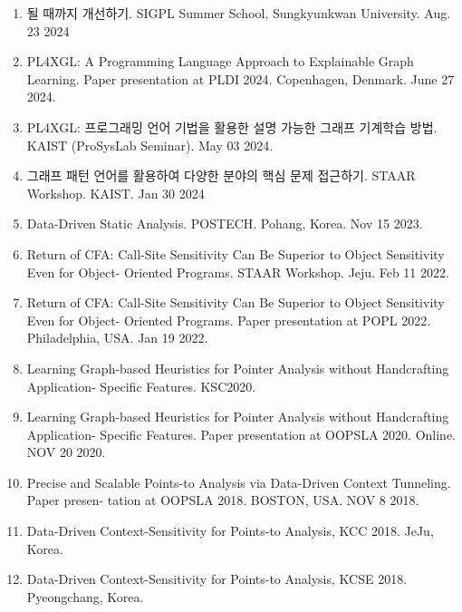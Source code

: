 \documentclass[letterpaper,11pt]{article}
\begin{document}
\begin{enumerate}
  \item{될 때까지 개선하기. SIGPL Summer School, Sungkyunkwan University. Aug. 23 2024}

  \item{PL4XGL: A Programming Language Approach to Explainable Graph Learning. Paper presentation at PLDI 2024. Copenhagen, Denmark. June 27 2024.}
  
  \item{PL4XGL: 프로그래밍 언어 기법을 활용한 설명 가능한 그래프 기계학습 방법. KAIST (ProSysLab Seminar). May 03 2024.}
  
  \item{그래프 패턴 언어를 활용하여 다양한 분야의 핵심 문제 접근하기. STAAR Workshop. KAIST. Jan 30 2024}

  \item{Data-Driven Static Analysis. POSTECH. Pohang, Korea. Nov 15 2023.}

  \item{Return of CFA: Call-Site Sensitivity Can Be Superior to Object Sensitivity Even for Object- Oriented Programs. STAAR Workshop. Jeju. Feb 11 2022.}

  \item{Return of CFA: Call-Site Sensitivity Can Be Superior to Object Sensitivity Even for Object- Oriented Programs. Paper presentation at POPL 2022. Philadelphia,  USA. Jan 19 2022.}
 
  \item{Learning Graph-based Heuristics for Pointer Analysis without Handcrafting Application- Specific Features. KSC2020.}
 
  \item{Learning Graph-based Heuristics for Pointer Analysis without Handcrafting Application- Specific Features. Paper presentation at OOPSLA 2020. Online. NOV 20 2020.}
 
  \item{Precise and Scalable Points-to Analysis via Data-Driven Context Tunneling. Paper presen- tation at OOPSLA 2018. BOSTON, USA. NOV 8 2018.}
 
  \item{Data-Driven Context-Sensitivity for Points-to Analysis, KCC 2018. JeJu, Korea.}
 
  \item{Data-Driven Context-Sensitivity for Points-to Analysis, KCSE 2018. Pyeongchang, Korea.}
\end{enumerate}

\end{document}
